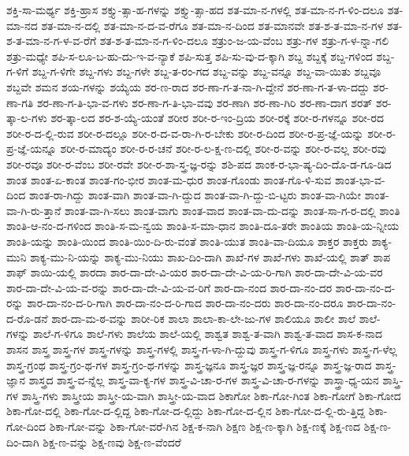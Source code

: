 {ಶಕ್ತಿ-ಸಾ-ಮರ್ಥ್ಯ
ಶಕ್ತಿ-ಹ್ರಾಸ
ಶಕ್ತ್ಯು-ತ್ಸಾ-ಹ-ಗಳನ್ನು
ಶಕ್ತ್ಯು-ತ್ಸಾ-ಹದ
ಶತ-ಮಾ-ನ-ಗಳಲ್ಲಿ
ಶತ-ಮಾ-ನ-ಗ-ಳಿಂ-ದಲೂ
ಶತ-ಮಾ-ನದ
ಶತ-ಮಾ-ನ-ದಲ್ಲಿ
ಶತ-ಮಾ-ನ-ದ-ವ-ರೆಗೂ
ಶತ-ಮಾ-ನ-ದಿಂದ
ಶತ-ಮಾನವೇ
ಶತ-ಶ-ತ-ಮಾ-ನ-ಗಳ
ಶತ-ಶ-ತ-ಮಾ-ನ-ಗ-ಳ-ವ-ರೆಗೆ
ಶತ-ಶ-ತ-ಮಾ-ನ-ಗ-ಳಿಂ-ದಲೂ
ಶತ್ರುಂ-ಜ-ಯ-ವೆಂಬ
ಶತ್ರು-ಗಳ
ಶತ್ರು-ಗ-ಳ-ನ್ನಾ-ಗಲಿ
ಶತ್ರು-ಮಧ್ಯೇ
ಶಪಿ-ಸ-ಲೂ-ಬ-ಹು-ದು-ಇ-ವ-ನ್ಯಾಕೆ
ಶಪಿ-ಸುತ್ತ
ಶಪಿ-ಸು-ವು-ದ-ಕ್ಕಾಗಿ
ಶಬ್ದ
ಶಬ್ದಕ್ಕೆ
ಶಬ್ದ-ಗಳಿಂದ
ಶಬ್ದ-ಗ-ಳಿಗೆ
ಶಬ್ದ-ಗ-ಳಿಗೇ
ಶಬ್ದ-ಗಳು
ಶಬ್ದ-ಗಳೇ
ಶಬ್ದ-ತ-ರಂ-ಗದ
ಶಬ್ದ-ವನ್ನು
ಶಬ್ದ-ವನ್ನೂ
ಶಬ್ದ-ವಾ-ಯಿತು
ಶಬ್ದವೂ
ಶಬ್ದವೇ
ಶಮನ
ಶಯ-ಗಳನ್ನು
ಶಯ್ಯೆಯ
ಶರ-ಣ-ರಾದ
ಶರ-ಣಾ-ಗ-ತ-ನಾ-ಗಿ-ದ್ದೇನೆ
ಶರ-ಣಾ-ಗ-ತ-ಳಾ-ದದ್ದು
ಶರ-ಣಾ-ಗತಿ
ಶರ-ಣಾ-ಗ-ತಿ-ಭಾ-ವ-ಗಳು
ಶರ-ಣಾ-ಗ-ತಿ-ಭಾ-ವವು
ಶರ-ಣಾಗಿ
ಶರ-ಣಾ-ಗಿರಿ
ಶರ-ಣಾ-ದಾಗ
ಶರತ್
ಶರ-ತ್ಕಾ-ಲ-ಗಳು
ಶರ-ತ್ಕಾ-ಲದ
ಶರ-ಶ-ಯ್ಯೆ-ಯಂತೆ
ಶರೀರ
ಶರೀ-ರ-ಇಂ-ದ್ರಿಯ
ಶರೀ-ರಕ್ಕೆ
ಶರೀ-ರ-ಗಳನ್ನೂ
ಶರೀ-ರದ
ಶರೀ-ರ-ದ-ಲ್ಲಿ-ರುವ
ಶರೀ-ರ-ದಲ್ಲೂ
ಶರೀ-ರ-ದ-ವ-ರಾ-ಗಿ-ರ-ಬೇಕು
ಶರೀ-ರ-ದಿಂದ
ಶರೀ-ರ-ಪ್ರ-ಜ್ಞೆ-ಯನ್ನು
ಶರೀ-ರ-ಪ್ರ-ಜ್ಞೆ-ಯನ್ನೂ
ಶರೀ-ರ-ಮಾದ್ಯಂ
ಶರೀ-ರ-ರ-ಚನೆ
ಶರೀ-ರ-ಲ-ಕ್ಷ-ಣ-ದಲ್ಲಿ
ಶರೀ-ರ-ವನ್ನು
ಶರೀ-ರ-ವಲ್ಲ
ಶರೀ-ರವು
ಶರೀ-ರವೂ
ಶರೀ-ರ-ವೆಂಬ
ಶರೀ-ರವೇ
ಶರೀ-ರ-ಶಾ-ಸ್ತ್ರ-ಜ್ಞ-ರನ್ನು
ಶಶಿ-ಪದ
ಶಾಂಕ-ರ-ಭಾ-ಷ್ಯ-ದಿಂ-ದೊ-ಡ-ಗೂ-ಡಿದ
ಶಾಂತ
ಶಾಂತ-ಏ-ಕಾಂತ
ಶಾಂತ-ಗಂ-ಭೀರ
ಶಾಂತ-ಮ-ಧುರ
ಶಾಂತ-ಗೊಂಡು
ಶಾಂತ-ಗೊ-ಳಿ-ಸುವ
ಶಾಂತ-ಭಾ-ವ-ದಿಂದ
ಶಾಂತ-ರಾ-ಗಿದ್ದು
ಶಾಂತ-ವಾಗಿ
ಶಾಂತ-ವಾ-ಗಿ-ದ್ದುದ
ಶಾಂತ-ವಾ-ಗಿ-ದ್ದು-ಬಿ-ಟ್ಟರು
ಶಾಂತ-ವಾ-ಗಿಯೇ
ಶಾಂತ-ವಾ-ಗಿ-ರು-ತ್ತಾನೆ
ಶಾಂತ-ವಾ-ಗಿ-ಸಲು
ಶಾಂತ-ವಾಗು
ಶಾಂತ-ವಾದ
ಶಾಂತ-ವಾ-ದು-ದನ್ನು
ಶಾಂತ-ಸಾ-ಗ-ರ-ದಲ್ಲಿ
ಶಾಂತಿ
ಶಾಂತಿ-ಆ-ನಂ-ದ-ಗಳಿಂದ
ಶಾಂತಿ-ಸ-ಮ-ನ್ವಯ
ಶಾಂತಿ-ಸ-ಮಾ-ಧಾನ
ಶಾಂತಿ-ದೂ-ತರೇ
ಶಾಂತಿಯ
ಶಾಂತಿ-ಯ-ನ್ನೀಯ
ಶಾಂತಿ-ಯನ್ನು
ಶಾಂತಿ-ಯಿಂದ
ಶಾಂತಿ-ಯಿಂ-ದಿ-ರು-ವಂತೆ
ಶಾಂತಿ-ಯುತ
ಶಾಂತಿ-ವಾ-ದಿಯೂ
ಶಾಕ್ತರ
ಶಾಕ್ತರು
ಶಾಕ್ಯ-ಮುನಿ
ಶಾಕ್ಯ-ಮು-ನಿ-ಯನ್ನು
ಶಾಕ್ಯ-ಮು-ನಿಯು
ಶಾಖ-ದಿಂ-ದಾಗಿ
ಶಾಖೆ-ಗಳ
ಶಾಖೆ-ಗಳು
ಶಾಖೆ-ಯಲ್ಲಿ
ಶಾತ್
ಶಾಪ
ಶಾಫ್
ಶಾಯಿ-ಯಲ್ಲಿ
ಶಾರದಾ
ಶಾರ-ದಾ-ದೇ-ವಿ-ಯರ
ಶಾರ-ದಾ-ದೇ-ವಿ-ಯ-ರಿ-ಗಾಗಿ
ಶಾರ-ದಾ-ದೇ-ವಿ-ಯ-ವರ
ಶಾರ-ದಾ-ದೇ-ವಿ-ಯ-ವ-ರನ್ನು
ಶಾರ-ದಾ-ದೇ-ವಿ-ಯ-ವ-ರಿಗೆ
ಶಾರ-ದಾ-ನಂದ
ಶಾರ-ದಾ-ನಂ-ದರ
ಶಾರ-ದಾ-ನಂ-ದ-ರನ್ನು
ಶಾರ-ದಾ-ನಂ-ದ-ರಿ-ಗಾಗಿ
ಶಾರ-ದಾ-ನಂ-ದ-ರಿ-ಗಾದ
ಶಾರ-ದಾ-ನಂ-ದರು
ಶಾರ-ದಾ-ನಂ-ದರೂ
ಶಾರ-ದಾ-ನಂ-ದ-ರೊ-ಡನೆ
ಶಾರ-ದಾ-ಮ-ಠ-ವನ್ನು
ಶಾರೀ-ರಿಕ
ಶಾಲಾ
ಶಾಲಾ-ಕಾ-ಲೇ-ಜು-ಗಳ
ಶಾಲಿಯೂ
ಶಾಲೀ
ಶಾಲೆ
ಶಾಲೆ-ಗಳನ್ನು
ಶಾಲೆ-ಗ-ಳಿಗೂ
ಶಾಲೆ-ಗಳು
ಶಾಲೆಯ
ಶಾಲೆ-ಯಲ್ಲಿ
ಶಾಶ್ವತ
ಶಾಶ್ವ-ತ-ವಾಗಿ
ಶಾಶ್ವ-ತ-ವಾದ
ಶಾಸ-ಕ-ನಾದ
ಶಾಸನ
ಶಾಸ್ತ್ರ
ಶಾಸ್ತ್ರ-ಗಳ
ಶಾಸ್ತ್ರ-ಗಳನ್ನು
ಶಾಸ್ತ್ರ-ಗಳಲ್ಲಿ
ಶಾಸ್ತ್ರ-ಗ-ಳಾ-ಗಿ-ದ್ದುವು
ಶಾಸ್ತ್ರ-ಗ-ಳಿಗೂ
ಶಾಸ್ತ್ರ-ಗಳು
ಶಾಸ್ತ್ರ-ಗ-ಳೆಲ್ಲ
ಶಾಸ್ತ್ರ-ಗ್ರಂಥ
ಶಾಸ್ತ್ರ-ಗ್ರಂ-ಥ-ಗಳ
ಶಾಸ್ತ್ರ-ಗ್ರಂ-ಥ-ಗಳನ್ನು
ಶಾಸ್ತ್ರ-ಜ್ಞನೂ
ಶಾಸ್ತ್ರ-ಜ್ಞರ
ಶಾಸ್ತ್ರ-ಜ್ಞ-ರನ್ನೂ
ಶಾಸ್ತ್ರ-ಜ್ಞ-ರಾದ
ಶಾಸ್ತ್ರ-ಜ್ಞಾನ
ಶಾಸ್ತ್ರದ
ಶಾಸ್ತ್ರ-ವ-ನ್ನೆಲ್ಲ
ಶಾಸ್ತ್ರ-ವಾ-ಕ್ಯ-ಗಳ
ಶಾಸ್ತ್ರ-ವಿ-ಚಾ-ರ-ಗಳ
ಶಾಸ್ತ್ರ-ವಿ-ಚಾ-ರ-ಗಳನ್ನು
ಶಾಸ್ತ್ರಾ-ಧ್ಯ-ಯನ
ಶಾಸ್ತ್ರಿ-ಗಳ
ಶಾಸ್ತ್ರಿ-ಗಳು
ಶಾಸ್ತ್ರೀಯ
ಶಾಸ್ತ್ರೀ-ಯ-ವಾಗಿ
ಶಾಸ್ತ್ರೀ-ಯ-ವಾದ
ಶಿಕಾಗೋ
ಶಿಕಾ-ಗೋ-ಗಿಂತ
ಶಿಕಾ-ಗೋಗೆ
ಶಿಕಾ-ಗೋದ
ಶಿಕಾ-ಗೋ-ದಲ್ಲಿ
ಶಿಕಾ-ಗೋ-ದ-ಲ್ಲಿದ್ದ
ಶಿಕಾ-ಗೋ-ದ-ಲ್ಲಿದ್ದು
ಶಿಕಾ-ಗೋ-ದ-ಲ್ಲಿನ
ಶಿಕಾ-ಗೋ-ದ-ಲ್ಲಿ-ರು-ತ್ತಿದ್ದ
ಶಿಕಾ-ಗೋ-ದಿಂದ
ಶಿಕಾ-ಗೋ-ವನ್ನು
ಶಿಕಾ-ಗೋ-ವರೆ-ಗಿನ
ಶಿಕ್ಷ-ಕ-ನಾಗಿ
ಶಿಕ್ಷಣ
ಶಿಕ್ಷ-ಣ-ಕ್ಕಾಗಿ
ಶಿಕ್ಷ-ಣಕ್ಕೆ
ಶಿಕ್ಷ-ಣದ
ಶಿಕ್ಷ-ಣ-ದಿಂ-ದಾಗಿ
ಶಿಕ್ಷ-ಣ-ವನ್ನು
ಶಿಕ್ಷ-ಣವು
ಶಿಕ್ಷ-ಣ-ವೆಂದರೆ
}
